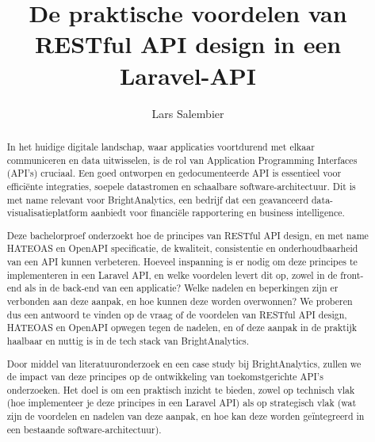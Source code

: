 \documentclass{hogent-article}
\title{De praktische voordelen van RESTful API design in een Laravel-API}
\author{Lars Salembier}
\begin{document}
\begin{abstract}
  In het huidige digitale landschap, waar applicaties voortdurend met elkaar communiceren en data uitwisselen, is de rol van Application Programming Interfaces (API's) cruciaal. Een goed ontworpen en gedocumenteerde API is essentieel voor efficiënte integraties, soepele datastromen en schaalbare software-architectuur. Dit is met name relevant voor BrightAnalytics, een bedrijf dat een geavanceerd data-visualisatieplatform aanbiedt voor financiële rapportering en business intelligence.

  \bigskip

  Deze bachelorproef onderzoekt hoe de principes van RESTful API design, en met name HATEOAS en OpenAPI specificatie, de kwaliteit, consistentie en onderhoudbaarheid van een API kunnen verbeteren. Hoeveel inspanning is er nodig om deze principes te implementeren in een Laravel API, en welke voordelen levert dit op, zowel in de front-end als in de back-end van een applicatie? Welke nadelen en beperkingen zijn er verbonden aan deze aanpak, en hoe kunnen deze worden overwonnen? We proberen dus een antwoord te vinden op de vraag of de voordelen van RESTful API design, HATEOAS en OpenAPI opwegen tegen de nadelen, en of deze aanpak in de praktijk haalbaar en nuttig is in de tech stack van BrightAnalytics.

  \bigskip

  Door middel van literatuuronderzoek en een case study bij BrightAnalytics, zullen we de impact van deze principes op de ontwikkeling van toekomstgerichte API's onderzoeken. Het doel is om een praktisch inzicht te bieden, zowel op technisch vlak (hoe implementeer je deze principes in een Laravel API) als op strategisch vlak (wat zijn de voordelen en nadelen van deze aanpak, en hoe kan deze worden geïntegreerd in een bestaande software-architectuur).
\end{abstract}

\tableofcontents



\printbibliography[heading=bibintoc]
\end{document}
